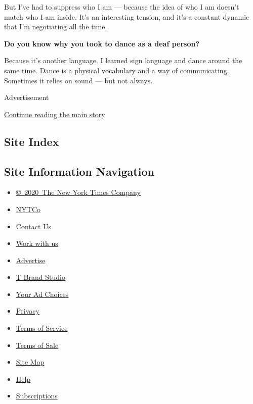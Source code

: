 But I've had to suppress who I am --- because the idea of who I am
doesn't match who I am inside. It's an interesting tension, and it's a
constant dynamic that I'm negotiating all the time.

\textbf{Do you know why you took to dance as a deaf person?}

Because it's another language. I learned sign language and dance around
the same time. Dance is a physical vocabulary and a way of
communicating. Sometimes it relies on sound --- but not always.

Advertisement

\protect\hyperlink{after-bottom}{Continue reading the main story}

\hypertarget{site-index}{%
\subsection{Site Index}\label{site-index}}

\hypertarget{site-information-navigation}{%
\subsection{Site Information
Navigation}\label{site-information-navigation}}

\begin{itemize}
\tightlist
\item
  \href{https://help.nytimes3xbfgragh.onion/hc/en-us/articles/115014792127-Copyright-notice}{©~2020~The
  New York Times Company}
\end{itemize}

\begin{itemize}
\tightlist
\item
  \href{https://www.nytco.com/}{NYTCo}
\item
  \href{https://help.nytimes3xbfgragh.onion/hc/en-us/articles/115015385887-Contact-Us}{Contact
  Us}
\item
  \href{https://www.nytco.com/careers/}{Work with us}
\item
  \href{https://nytmediakit.com/}{Advertise}
\item
  \href{http://www.tbrandstudio.com/}{T Brand Studio}
\item
  \href{https://www.nytimes3xbfgragh.onion/privacy/cookie-policy\#how-do-i-manage-trackers}{Your
  Ad Choices}
\item
  \href{https://www.nytimes3xbfgragh.onion/privacy}{Privacy}
\item
  \href{https://help.nytimes3xbfgragh.onion/hc/en-us/articles/115014893428-Terms-of-service}{Terms
  of Service}
\item
  \href{https://help.nytimes3xbfgragh.onion/hc/en-us/articles/115014893968-Terms-of-sale}{Terms
  of Sale}
\item
  \href{https://spiderbites.nytimes3xbfgragh.onion}{Site Map}
\item
  \href{https://help.nytimes3xbfgragh.onion/hc/en-us}{Help}
\item
  \href{https://www.nytimes3xbfgragh.onion/subscription?campaignId=37WXW}{Subscriptions}
\end{itemize}

